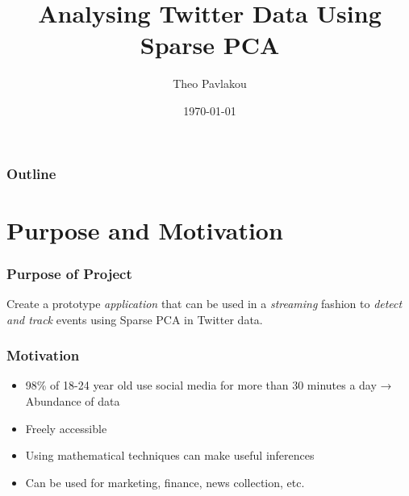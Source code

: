 \documentclass{beamer}
\title[Short title]{Analysing Twitter Data Using Sparse PCA} %
\author{Theo Pavlakou} %
\institute[Imperial College London] %
{
Imperial College London \\ %
\medskip
\textit{theo.pavlakou10@imperial.ac.uk} %
}
\date{\today} %
\begin{document}
\begin{frame}
\titlepage %
\end{frame}

\begin{frame}
\frametitle{Outline} %
\tableofcontents %
\end{frame}


\section{Purpose and Motivation} %


\begin{frame}
\frametitle{Purpose of Project}
Create a prototype \textit{application} that can be used in a \textit{streaming} fashion to \textit{detect and track} events using Sparse PCA in Twitter data.
\end{frame}

\begin{frame}
\frametitle{Motivation}
\begin{itemize}

\item 98\% of 18-24 year old use social media for more than 30 minutes a day → Abundance of data 
\item Freely accessible
\item Using mathematical techniques can make useful inferences
\item Can be used for marketing, finance, news collection, etc.
\end{itemize}
\end{frame}
\end{document}
